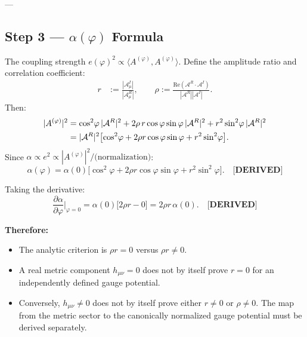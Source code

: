 ---

\subsection{Step 3 — $\alpha(\varphi)$ Formula}
\label{sec:phi_step3}

The coupling strength $e(\varphi)^2 \propto \langle A^{(\varphi)}, A^{(\varphi)}\rangle$.
Define the amplitude ratio and correlation coefficient:
\begin{align}
  r &:= \frac{|\mathcal{A}^I_\mu|}{|\mathcal{A}^R_\mu|}, \qquad
  \rho := \frac{\mathrm{Re}(\mathcal{A}^R \cdot \mathcal{A}^I)}{|\mathcal{A}^R||\mathcal{A}^I|}.
\end{align}
Then:
\begin{align}
  |A^{(\varphi)}|^2
  &= \cos^2\!\varphi\,|\mathcal{A}^R|^2
   + 2\rho\,r\cos\varphi\sin\varphi\,|\mathcal{A}^R|^2
   + r^2\sin^2\!\varphi\,|\mathcal{A}^R|^2 \notag\\
  &= |\mathcal{A}^R|^2\bigl[\cos^2\!\varphi + 2\rho r\cos\varphi\sin\varphi + r^2\sin^2\!\varphi\bigr].
\end{align}
Since $\alpha \propto e^2 \propto |A^{(\varphi)}|^2 / \text{(normalization)}$:
\begin{equation}
  \boxed{\alpha(\varphi) = \alpha(0)\bigl[\cos^2\!\varphi + 2\rho r\cos\varphi\sin\varphi + r^2\sin^2\!\varphi\bigr].}
  \label{eq:alpha_phi}
  \quad \textbf{[DERIVED]}
\end{equation}

Taking the derivative:
\begin{equation}
  \frac{\partial\alpha}{\partial\varphi}\bigg|_{\varphi=0}
  = \alpha(0)\bigl[2\rho r - 0\bigr]
  = 2\rho r\,\alpha(0).
  \label{eq:dalpha_dphi}
  \quad \textbf{[DERIVED]}
\end{equation}

\noindent \textbf{Therefore:}
\begin{itemize}
  \item The analytic criterion is $\rho r=0$ versus $\rho r\neq0$.
  \item A real metric component $h_{\mu\nu}=0$ does not by itself prove
    $r=0$ for an independently defined gauge potential.
  \item Conversely, $h_{\mu\nu}\neq0$ does not by itself prove either
    $r\neq0$ or $\rho\neq0$.  The map from the metric sector to the
    canonically normalized gauge potential must be derived separately.
\end{itemize}

